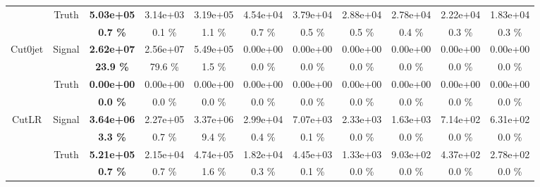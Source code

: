 \begin{appendices}
\begin{landscape}
\begin{table}
\begin{tabular}{|c|c|>{\bfseries}c|c|c|c|c|c|c|c|c|}
                                    & \multirow{2}{*}{Truth}    & 5.03e+05 & 3.14e+03 & 3.19e+05 & 4.54e+04 & 3.79e+04 & 2.88e+04 & 2.78e+04 & 2.22e+04 & 1.83e+04 \\
                                    &                           & 0.7 \%   & 0.1 \%   & 1.1 \%   & 0.7 \%   & 0.5 \%   & 0.5 \%   & 0.4 \%   & 0.3 \%   & 0.3 \%   \\
    \hline                                                              
    \hline                                                              
    \multirow{4}{*}{Cut0jet}        & \multirow{2}{*}{Signal}   & 2.62e+07 & 2.56e+07 & 5.49e+05 & 0.00e+00 & 0.00e+00 & 0.00e+00 & 0.00e+00 & 0.00e+00 & 0.00e+00 \\
                                    &                           & 23.9 \%  & 79.6 \%  & 1.5 \%   & 0.0 \%   & 0.0 \%   & 0.0 \%   & 0.0 \%   & 0.0 \%   & 0.0 \%   \\
    \cline{2-11}                                                                                    
                                    & \multirow{2}{*}{Truth}    & 0.00e+00 & 0.00e+00 & 0.00e+00 & 0.00e+00 & 0.00e+00 & 0.00e+00 & 0.00e+00 & 0.00e+00 & 0.00e+00 \\
                                    &                           & 0.0 \%   & 0.0 \%   & 0.0 \%   & 0.0 \%   & 0.0 \%   & 0.0 \%   & 0.0 \%   & 0.0 \%   & 0.0 \%   \\
    \hline                                                              
    \hline                                                              
    \multirow{4}{*}{CutLR}          & \multirow{2}{*}{Signal}   & 3.64e+06 & 2.27e+05 & 3.37e+06 & 2.99e+04 & 7.07e+03 & 2.33e+03 & 1.63e+03 & 7.14e+02 & 6.31e+02 \\
                                    &                           & 3.3 \%   & 0.7 \%   & 9.4 \%   & 0.4 \%   & 0.1 \%   & 0.0 \%   & 0.0 \%   & 0.0 \%   & 0.0 \%   \\
    \cline{2-11}                                                                                    
                                    & \multirow{2}{*}{Truth}    & 5.21e+05 & 2.15e+04 & 4.74e+05 & 1.82e+04 & 4.45e+03 & 1.33e+03 & 9.03e+02 & 4.37e+02 & 2.78e+02 \\
                                    &                           & 0.7 \%   & 0.7 \%   & 1.6 \%   & 0.3 \%   & 0.1 \%   & 0.0 \%   & 0.0 \%   & 0.0 \%   & 0.0 \%   \\
    \hline                                                              

\end{tabular}
\end{table}
\end{landscape}
\end{appendices}
